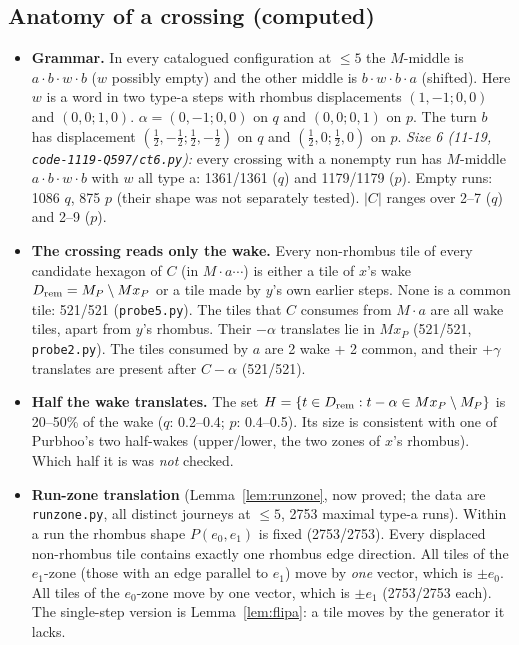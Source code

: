 \documentclass[11pt]{article}
\theoremstyle{definition}\newtheorem{definition}[theorem]{Definition}\newtheorem{remark}[theorem]{Remark}
\begin{document}
\subsection{Anatomy of a crossing (computed)}
\begin{itemize}
\item \textbf{Grammar.} In every catalogued configuration at $\le5$ the $M$-middle is $a\cdot b\cdot w\cdot b$ ($w$ possibly empty) and the other middle is $b\cdot w\cdot b\cdot a$ (shifted).
Here $w$ is a word in two type-a steps with rhombus displacements $(1,-1;0,0)$ and $(0,0;1,0)$. $\alpha=(0,-1;0,0)$ on $q$ and $(0,0;0,1)$ on $p$. The turn $b$ has displacement $(\tfrac12,-\tfrac12;\tfrac12,-\tfrac12)$ on $q$ and $(\tfrac12,0;\tfrac12,0)$ on $p$.
\emph{Size 6 (11-19, \texttt{code-1119-Q597/ct6.py}):} every crossing with a nonempty run has $M$-middle $a\cdot b\cdot w\cdot b$ with $w$ all type a: 1361/1361 ($q$) and 1179/1179 ($p$). Empty runs: 1086 $q$, 875 $p$ (their shape was not separately tested).
$|C|$ ranges over 2--7 ($q$) and 2--9 ($p$).
\item \textbf{The crossing reads only the wake.} Every non-rhombus tile of every candidate hexagon of $C$ (in $M\cdot a\cdots$) is either a tile of $x$'s wake $D_{\rm rem}=M_P\setminus Mx_P$ or a tile made by $y$'s own earlier steps. None is a common tile: 521/521 (\texttt{probe5.py}).
The tiles that $C$ consumes from $M\cdot a$ are all wake tiles, apart from $y$'s rhombus. Their $-\alpha$ translates lie in $Mx_P$ (521/521, \texttt{probe2.py}).
The tiles consumed by $a$ are 2 wake + 2 common, and their $+\gamma$ translates are present after $C-\alpha$ (521/521).
\item \textbf{Half the wake translates.} The set $H=\{t\in D_{\rm rem}: t-\alpha\in Mx_P\setminus M_P\}$ is 20--50\% of the wake ($q$: 0.2--0.4; $p$: 0.4--0.5). Its size is consistent with one of Purbhoo's two half-wakes (upper/lower, the two zones of $x$'s rhombus). Which half it is was \emph{not} checked.
\item \textbf{Run-zone translation} (Lemma~\ref{lem:runzone}, now proved; the data are \texttt{runzone.py}, all distinct journeys at $\le5$, 2753 maximal type-a runs). Within a run the rhombus shape $P(e_0,e_1)$ is fixed (2753/2753).
Every displaced non-rhombus tile contains exactly one rhombus edge direction. All tiles of the $e_1$-zone (those with an edge parallel to $e_1$) move by \emph{one} vector, which is $\pm e_0$.
All tiles of the $e_0$-zone move by one vector, which is $\pm e_1$ (2753/2753 each). The single-step version is Lemma~\ref{lem:flipa}: a tile moves by the generator it lacks.

\end{itemize}
\end{document}
